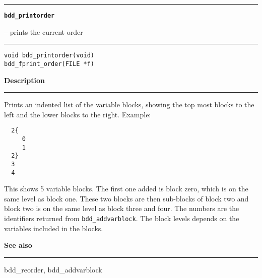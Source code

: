 \begin{minipage}{\textwidth}

\noindent\begin{minipage}{\textwidth}
\rule{\textwidth}{0.5mm}
{\tt\bf bdd\_printorder }
\--- prints the current order  \hspace{\fill}
\\\rule[1.5ex]{\textwidth}{0.5mm}
\end{minipage}

\noindent\begin{verbatim}
void bdd_printorder(void)
bdd_fprint_order(FILE *f)
\end{verbatim}

\vspace{\parsep}\noindent
{\bf Description}\\\rule[1.5ex]{\textwidth}{0.2mm}\vspace{-1.5ex}\setlength{\parindent}{1em}
Prints an indented list of the variable blocks, showing the top
           most blocks to the left and the lower blocks to the right.
	   Example:\\
	   \begin{verbatim}
  2{
     0
     1
  2}
  3
  4
\end{verbatim}
           This shows 5 variable blocks. The first one added is block zero,
	   which is on the same level as block one. These two blocks are then
	   sub-blocks of block two and block two is on the same level as
	   block three and four. The numbers are the identifiers returned
	   from {\tt bdd\_addvarblock}. The block levels depends on the
	   variables included in the blocks.
	   

\vspace{\parsep}\vspace{\baselineskip}\noindent
{\bf See also}\\\rule[1.5ex]{\textwidth}{0.2mm}\vspace{-1.5ex}
bdd\_reorder, bdd\_addvarblock 
\end{minipage}
\vspace{8ex}
